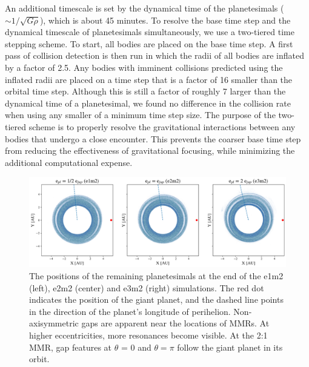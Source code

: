 \documentclass[twocolumn]{aastex63}
\begin{document}
An additional timescale is set by the dynamical time of the planetesimals ($\sim 1/\sqrt{G \rho}$), which is about 45 minutes. To 
resolve the base time step and the dynamical timescale of planetesimals simultaneously, we use a two-tiered time stepping scheme. 
To start, all bodies are placed on the base time step. A first pass of collision detection is then run in 
which the radii of all bodies are inflated by a factor of 2.5. Any bodies with imminent collisions predicted using the inflated radii are 
placed on a time step that is a factor of 16 smaller than the orbital
time step. Although this is still a factor of roughly 7 larger than the dynamical time of a planetesimal, we found no difference in the collision rate
when using any smaller of a minimum time step size.
The purpose of the two-tiered scheme is to properly resolve 
the gravitational interactions between any bodies that undergo a close encounter. This prevents the coarser base time step from 
reducing the effectiveness of gravitational focusing, while minimizing the additional computational expense.

\begin{figure}
\begin{center}
    \includegraphics[width=\textwidth]{figures/xy.png}
    \caption{The positions of the remaining planetesimals at the end of the e1m2 (left), e2m2 (center) and e3m2 (right) simulations. The red dot 
    indicates the position of the giant planet, and the dashed line points in the direction of the planet's longitude of perihelion. Non-axisymmetric gaps 
    are apparent near the locations of MMRs. At higher eccentricities, more resonances become visible. At the 2:1 MMR, gap features at $\theta$ = 0 
    and $\theta = \pi$ follow the giant planet in its orbit.\label{fig:xy}}
\end{center}
\end{figure}
\end{document}
